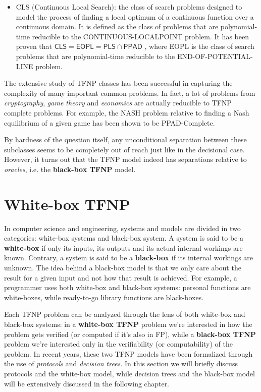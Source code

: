\begin{itemize}
    \item \textsf{CLS} (Continuous Local Search): the class of search problems designed to model the process of finding a local optimum of a continuous function over a continuous domain. It is defined as the class of problems that are polynomial-time reducible to the CONTINUOUS-LOCALPOINT problem. It has been proven that $\mathsf{CLS} = \mathsf{EOPL} = \mathsf{PLS} \cap \mathsf{PPAD}$ \cite{gradient_descent, Further_collapses_TFNP}, where \textsf{EOPL} is the class of search problems that are polynomial-time reducible to the END-OF-POTENTIAL-LINE problem.
\end{itemize}

The extensive study of \textsf{TFNP} classes has been successful in capturing the complexity of many important common problems. In fact, a lot of problems from \textit{cryptography}, \textit{game theory} and \textit{economics} are actually reducible to \textsf{TFNP} complete problems. For example, the $\mathrm{NASH}$ problem relative to finding a Nash equilibrium of a given game has been shown to be \textsf{PPAD}-Complete.

By hardness of the question itself, any unconditional separation between these subclasses seems to be completely out of reach just like in the decisional case. However, it turns out that the \textsf{TFNP} model indeed has separations relative to \textit{oracles}, i.e. the \textbf{black-box \textsf{TFNP}} model.
 
\quad

\section{White-box \textsf{TFNP}}

In computer science and engineering, systems and models are divided in two categories: white-box systems and black-box system. A system is said to be a \textbf{white-box} if only its inputs, its outputs and its actual internal workings are known. Contrary, a system is said to be a \textbf{black-box} if its internal workings are unknown. The idea behind a black-box model is that we only care about the result for a given input and not how that result is achieved. For example, a programmer uses both white-box and black-box systems: personal functions are white-boxes, while ready-to-go library functions are black-boxes. 

Each \textsf{TFNP} problem can be analyzed through the lens of both white-box and black-box systems: in a \textbf{white-box \textsf{TFNP}} problem we're interested in how the problem gets verified (or computed if it's also in \textsf{FP}), while a \textbf{black-box \textsf{TFNP}} problem we're interested only in the verifiability (or computability) of the problem. In recent years, these two \textsf{TFNP} models have been formalized through the use of \textit{protocols} and \textit{decision trees}. In this section we will briefly discuss protocols and the white-box model, while decision trees and the black-box model will be extensively discussed in the following chapter. 

